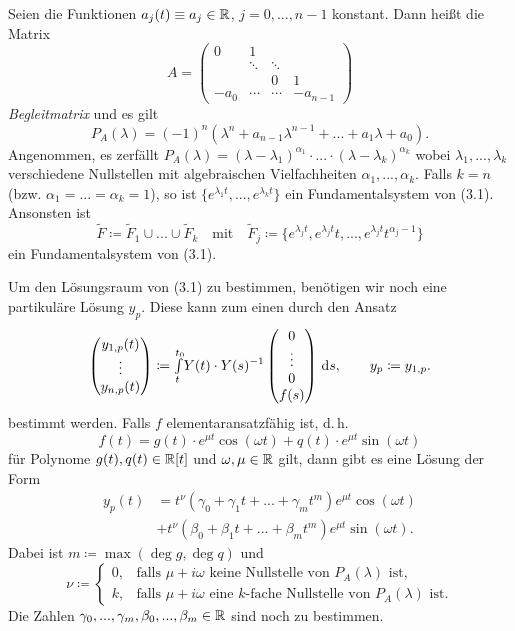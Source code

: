 \documentclass{cheat-sheet}
\begin{document}
\begin{bem}
  Seien die Funktionen $a_j(t) \equiv a_j \in \mathbb{R}$, $j = 0, ..., n-1$ konstant. Dann heißt die Matrix
  \[
    A = \begin{pmatrix}
      0 & 1 && \\
      & \ddots & \ddots & \\
      && 0 & 1\\
      - a_0 & \cdots & \cdots & -a_{n-1}
    \end{pmatrix}
  \]
  \emph{Begleitmatrix} und es gilt
  \[ P_A(\lambda) = (-1)^n (\lambda^n + a_{n-1} \lambda^{n-1} + ... + a_1 \lambda + a_0). \]
  Angenommen, es zerfällt $P_A(\lambda) = (\lambda - \lambda_1)^{\alpha_1} \cdot ... \cdot (\lambda - \lambda_k)^{\alpha_k}$ wobei $\lambda_1, ..., \lambda_k$ verschiedene Nullstellen mit algebraischen Vielfachheiten $\alpha_1, ..., \alpha_k$.
  Falls $k = n$ (bzw. $\alpha_1 = ... = \alpha_k = 1$), so ist $\{ e^{\lambda_1 t}, ..., e^{\lambda_k t} \}$ ein Fundamentalsystem von (3.1). Ansonsten ist
  \[
    \tilde{F} \coloneqq \tilde{F}_1 \cup ... \cup \tilde{F}_k
    \quad \text{mit} \quad
    \tilde{F}_j \coloneqq \{ e^{\lambda_j t}, e^{\lambda_j t} t, ..., e^{\lambda_j t} t^{\alpha_j - 1} \}
  \]
  ein Fundamentalsystem von (3.1).
\end{bem}


\begin{bem}
  Um den Lösungsraum von (3.1) zu bestimmen, benötigen wir noch eine partikuläre Lösung $y_p$. Diese kann zum einen durch den Ansatz
  \[
    \begin{pmatrix}
      y_{1,p}(t)\\
      \vdots\\
      y_{n,p}(t)
    \end{pmatrix} \coloneqq {\textstyle \int\limits_{t}^{t_0}} Y(t) \cdot Y(s)^{-1} \begin{pmatrix}
      0\\ \vdots \\ 0 \\ f(s)
    \end{pmatrix} \,\mathrm{d} s, \qquad
    y_p \coloneqq y_{1,p}.
  \]
  bestimmt werden. Falls $f$ elementaransatzfähig ist, d.\,h.
  \[ f(t) = g(t) \cdot e^{\mu t} \cos(\omega t) + q(t) \cdot e^{\mu t} \sin(\omega t) \]
  für Polynome $g(t), q(t) \in \mathbb{R}[t]$ und $\omega, \mu \in \mathbb{R}$ gilt, dann gibt es eine Lösung der Form
  \begin{align*}
    y_p(t) &= t^{\nu} (\gamma_0 + \gamma_1 t + ... + \gamma_m t^m) e^{\mu t} \cos(\omega t)\\
    & + t^{\nu} (\beta_0 + \beta_1 t + ... + \beta_m t^m) e^{\mu t} \sin(\omega t).
  \end{align*}
  Dabei ist $m \coloneqq \max(\deg g, \deg q)$ und
  \[
    \nu \coloneqq \begin{cases}
      0, & \text{falls $\mu + i \omega$ keine Nullstelle von $P_A(\lambda)$ ist,}\\
      k, & \text{falls $\mu + i \omega$ eine $k$-fache Nullstelle von $P_A(\lambda)$ ist}.
    \end{cases}
  \]
  Die Zahlen $\gamma_0, ..., \gamma_m, \beta_0, ..., \beta_m \in \mathbb{R}$ sind noch zu bestimmen.
\end{bem}
\end{document}
